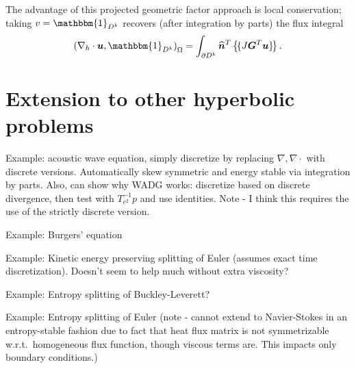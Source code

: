 \documentclass[preprint,10pt]{article}
\theoremstyle{definition}
\theoremstyle{lemma}
\newcommand{\bbm}[1]{\mathbbm{#1}}
\newcommand{\LRp}[1]{\left( #1 \right)}
\newcommand{\LRc}[1]{\left\{ #1 \right\}}
\newcommand{\Grad} {\ensuremath{\nabla}}
\newcommand{\avg}[1] {\ensuremath{\LRc{\!\{#1\}\!}}}
\begin{document}
The advantage of this projected geometric factor approach is local conservation; taking $v = \bbm{1}_{D^k}$ recovers (after integration by parts) the flux integral
\[
\LRp{\Grad_h \cdot \bm{u},\bbm{1}_{D^k}}_{\Omega} = \int_{\partial D^k}\widehat{\bm{n}}^T\avg{J\bm{G}^T\bm{u}}.
\]

\section{Extension to other hyperbolic problems}

Example: acoustic wave equation, simply discretize by replacing $\Grad, \Grad\cdot$ with discrete versions.  Automatically skew symmetric and energy stable via integration by parts.  Also, can show why WADG works: discretize based on discrete divergence, then test with $T_{c^2}^{-1}p$ and use identities.  Note - I think this requires the use of the strictly discrete version.  

Example: Burgers' equation

Example: Kinetic energy preserving splitting of Euler (assumes exact time discretization).  Doesn't seem to help much without extra viscosity?  

Example: Entropy splitting of Buckley-Leverett?

Example: Entropy splitting of Euler (note - cannot extend to Navier-Stokes in an entropy-stable fashion due to fact that heat flux matrix is not symmetrizable w.r.t.\ homogeneous flux function, though viscous terms are.  This impacts only boundary conditions.) 
\end{document}
